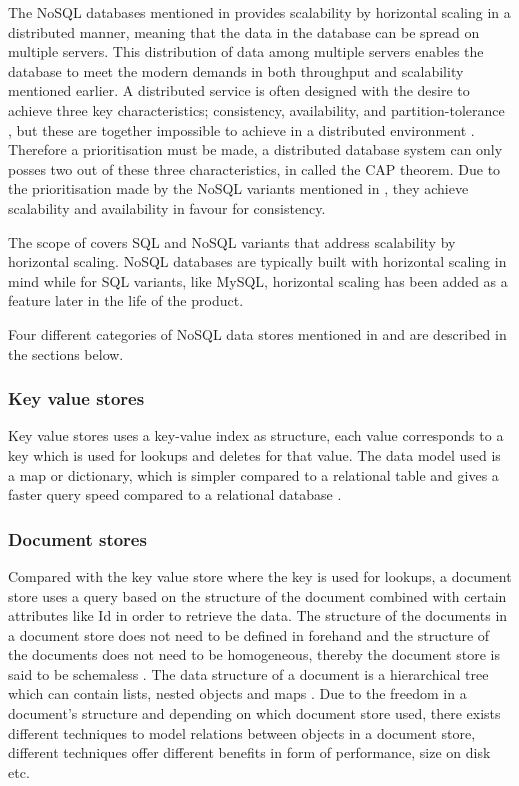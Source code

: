 The NoSQL databases mentioned in \cite{Catell} provides scalability by horizontal scaling in a distributed manner, meaning that the data in the database can be spread on multiple servers. This distribution of data among multiple servers enables the database to meet the modern demands in both throughput and scalability \cite{Abadi} mentioned earlier. A distributed service is often designed with the desire to achieve three key characteristics; consistency, availability, and partition-tolerance \cite{Brewer}, but these are together impossible to achieve in a distributed environment \cite{Brewer}. Therefore a prioritisation must be made, a distributed database system can only posses two out of these three characteristics, in \cite{Brewer} called the CAP theorem. Due to the prioritisation made by the NoSQL variants mentioned in \cite{Catell}, they achieve scalability and availability in favour for consistency. 

The scope of \cite{Catell} covers SQL and NoSQL variants that address scalability by horizontal scaling. NoSQL databases are typically built with horizontal scaling in mind while for SQL variants, like MySQL, horizontal scaling has been added as a feature later in the life of the product.

Four different categories of NoSQL data stores mentioned in \cite{Catell} and \cite{NoSQLDistilled} are described in the sections below.

\subsubsection{Key value stores}

Key value stores uses a key-value index as structure, each value corresponds to a key which is used for lookups and deletes for that value\cite{Catell}. The data model used is a map or dictionary, which is simpler compared to a relational table and gives a faster query speed compared to a relational database \cite{NoSQLSurvey}. 

\subsubsection{Document stores}

Compared with the key value store where the key is used for lookups, a document store uses a query based on the structure of the document combined with certain attributes like Id in order to retrieve the data. The structure of the documents in a document store does not need to be defined in forehand and the structure of the documents does not need to be homogeneous, thereby the document store is said to be schemaless \cite{NoSQLDistilled}. The data structure of a document is a hierarchical tree which can contain lists, nested objects and maps \cite{Catell, NoSQLDistilled}. Due to the freedom in a document's structure and depending on which document store used, there exists different techniques to model relations between objects in a document store, different techniques offer different benefits in form of performance, size on disk etc. 

